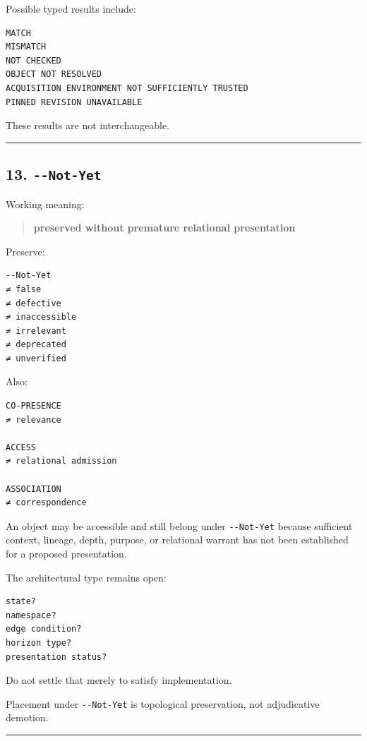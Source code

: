 Possible typed results include:

\begin{verbatim}
MATCH
MISMATCH
NOT CHECKED
OBJECT NOT RESOLVED
ACQUISITION ENVIRONMENT NOT SUFFICIENTLY TRUSTED
PINNED REVISION UNAVAILABLE
\end{verbatim}

These results are not interchangeable.

\begin{center}\rule{0.5\linewidth}{0.5pt}\end{center}

\subsection{\texorpdfstring{13.
\texttt{-\/-Not-Yet}}{13. -\/-Not-Yet}}\label{not-yet}

Working meaning:

\begin{quote}
\textbf{preserved without premature relational presentation}
\end{quote}

Preserve:

\begin{verbatim}
--Not-Yet
≠ false
≠ defective
≠ inaccessible
≠ irrelevant
≠ deprecated
≠ unverified
\end{verbatim}

Also:

\begin{verbatim}
CO-PRESENCE
≠ relevance

ACCESS
≠ relational admission

ASSOCIATION
≠ correspondence
\end{verbatim}

An object may be accessible and still belong under \texttt{-\/-Not-Yet}
because sufficient context, lineage, depth, purpose, or relational
warrant has not been established for a proposed presentation.

The architectural type remains open:

\begin{verbatim}
state?
namespace?
edge condition?
horizon type?
presentation status?
\end{verbatim}

Do not settle that merely to satisfy implementation.

Placement under \texttt{-\/-Not-Yet} is topological preservation, not
adjudicative demotion.

\begin{center}\rule{0.5\linewidth}{0.5pt}\end{center}

